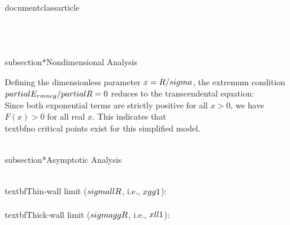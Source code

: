 \\documentclass{article}
\begin{document}
\\[
  \\frac{\\partial E_{\\rm neg}}{\\partial \\sigma} = 2 \pi \left(\frac{A^{2} R e^{- \frac{2 R^{2}}{\sigma^{2}}}}{4 \pi \sigma} + \frac{A^{2} R e^{- \frac{8 R^{2}}{\sigma^{2}}}}{2 \pi \sigma} - \frac{\sqrt{2} A^{2} \operatorname{erf}{\left(\frac{\sqrt{2} R}{\sigma} \right)}}{16 \sqrt{\pi}} - \frac{\sqrt{2} A^{2} \operatorname{erf}{\left(\frac{2 \sqrt{2} R}{\sigma} \right)}}{16 \sqrt{\pi}}\right) = 0
\\]
\\[
  \\Longrightarrow \\sigma = \text{No analytical solutions found}
\\]

\\subsection*{Nondimensional Analysis}

Defining the dimensionless parameter $x = R/\\sigma$, the extremum condition 
$\\partial E_{\\rm neg}/\\partial R = 0$ reduces to the transcendental equation:
\\[
  F(x) = e^{-2x^2} + \frac{1}{2}e^{-8x^2} = 0
\\]

Since both exponential terms are strictly positive for all $x > 0$, we have $F(x) > 0$ 
for all real $x$. This indicates that \\textbf{no critical points exist} for this 
simplified model.

\\subsection*{Asymptotic Analysis}

\\textbf{Thin-wall limit} ($\\sigma \\ll R$, i.e., $x \\gg 1$):
\\[
  \\text{erf}(x) \\approx 1 - \\frac{e^{-x^2}}{\\sqrt{\\pi} x}
\\]

\\textbf{Thick-wall limit} ($\\sigma \\gg R$, i.e., $x \\ll 1$):
\\[
  \\text{erf}(x) \\approx \\frac{2x}{\\sqrt{\\pi}}\\left(1 - \\frac{x^2}{3} + \\cdots\\right)
\\]
\end{document}

